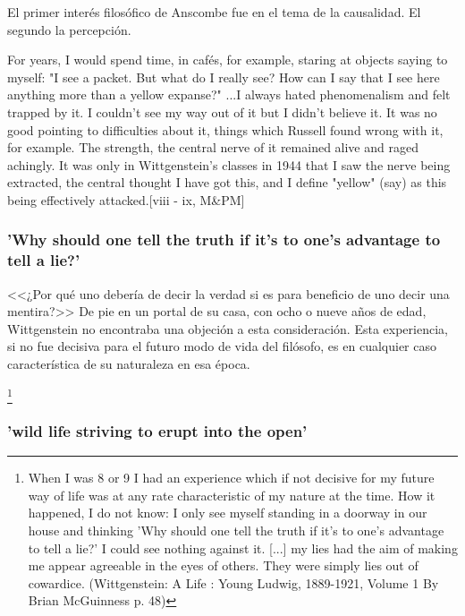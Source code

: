 \documentclass[../main.tex]{subfiles}
\begin{document}
El primer interés filosófico de Anscombe fue en el tema de la causalidad.
El segundo la percepción.

For years, I would spend time, in cafés, for example, staring at objects saying to myself: "I see a packet. But what do I really see? How can I say that I see here anything more than a yellow expanse?" ...I always hated phenomenalism and felt trapped by it. I couldn't see my way out of it but I didn't believe it. It was no good pointing to difficulties about it, things which Russell found wrong with it, for example. The strength, the central nerve of it remained alive and raged achingly. It was only in Wittgenstein's classes in 1944 that I saw the nerve being extracted, the central thought I have got this, and I define "yellow" (say) as this being effectively attacked.[viii - ix, M\&PM]

\subsubsection{'Why should one tell the truth if it's to one's advantage to tell a lie?'}
<<¿Por qué uno debería de decir la verdad si es para beneficio de uno decir una mentira?>> De pie en un portal de su casa, con ocho o nueve años de edad, Wittgenstein no encontraba una objeción a esta consideración. Esta experiencia, si no fue decisiva para el futuro modo de vida del filósofo, es en cualquier caso característica de su naturaleza en esa época. 

\footnote{When I was 8 or 9 I had an experience which if not decisive for my future way of life was at any rate characteristic of my nature at the time. How it happened, I do not know: I only see myself standing in a doorway in our house and thinking 'Why should one tell the truth if it's to one's advantage to tell a lie?' I could see nothing against it. [...] my lies had the aim of making me appear agreeable in the eyes of others. They were simply lies out of cowardice. (Wittgenstein: A Life : Young Ludwig, 1889-1921, Volume 1 By Brian McGuinness p. 48)}

\subsubsection{'wild life striving to erupt into the open'}
\end{document}
